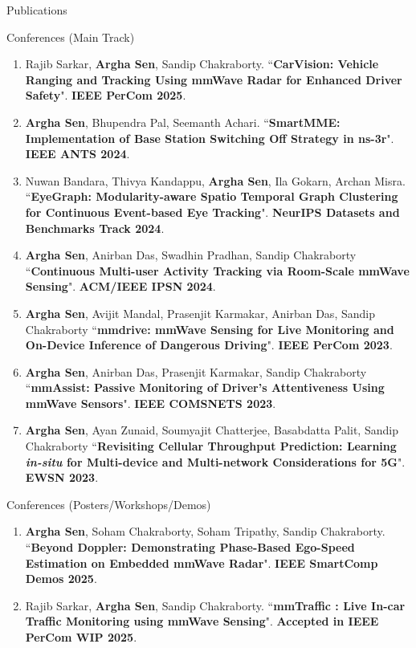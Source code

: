\documentclass{resume} %
\begin{document}
\begin{rSection}{Publications}
\begin{rSubsection}{Conferences (Main Track)}{}{}{}
\begin{enumerate}
				\item Rajib Sarkar, \textbf{Argha Sen}, Sandip Chakraborty.	``\textbf{CarVision: Vehicle Ranging and Tracking Using mmWave Radar for Enhanced Driver Safety}". \textbf{IEEE PerCom 2025}.
				
				\item \textbf{Argha Sen}, Bhupendra Pal, Seemanth Achari. 
				``\textbf{SmartMME: Implementation of Base Station Switching Off Strategy in ns-3r}". \textbf{IEEE ANTS 2024}.
				
				\item Nuwan Bandara, Thivya Kandappu, \textbf{Argha Sen}, Ila Gokarn, Archan Misra.
				``\textbf{EyeGraph: Modularity-aware Spatio Temporal Graph Clustering for Continuous Event-based Eye Tracking}".
				\textbf{NeurIPS Datasets and Benchmarks Track 2024}.
				
				\item \textbf{Argha Sen}, Anirban Das, Swadhin Pradhan, Sandip Chakraborty ``\textbf{Continuous Multi-user Activity Tracking via Room-Scale mmWave Sensing}". \textbf{ACM/IEEE IPSN 2024}.
				
				\item \textbf{Argha Sen}, Avijit Mandal, Prasenjit Karmakar, Anirban Das, Sandip Chakraborty ``\textbf{mmdrive: mmWave Sensing for Live Monitoring and On-Device Inference of Dangerous Driving}". \textbf{IEEE PerCom 2023}.
				
				\item \textbf{Argha Sen}, Anirban Das, Prasenjit Karmakar, Sandip Chakraborty ``\textbf{mmAssist: Passive Monitoring of Driver's Attentiveness Using mmWave Sensors}". \textbf{IEEE COMSNETS 2023}.
				
				\item \textbf{Argha Sen}, Ayan Zunaid, Soumyajit Chatterjee, Basabdatta Palit, Sandip Chakraborty ``\textbf{Revisiting Cellular Throughput Prediction: Learning \textit{in-situ} for Multi-device and Multi-network Considerations for 5G}". \textbf{EWSN 2023}.
				
			\end{enumerate}
			
		\end{rSubsection}{}{}{}{}		
		
		\begin{rSubsection}{Conferences (Posters/Workshops/Demos)}{}{}{}
			
			\begin{enumerate}
				\small
				\item \textbf{Argha Sen}, Soham Chakraborty, Soham Tripathy, Sandip Chakraborty.	``\textbf{Beyond Doppler: Demonstrating Phase-Based Ego-Speed Estimation on Embedded mmWave Radar}". \textbf{IEEE SmartComp Demos 2025}.
				\item Rajib Sarkar, \textbf{Argha Sen}, Sandip Chakraborty.	``\textbf{mmTraffic : Live In-car Traffic Monitoring using mmWave Sensing}". \textbf{Accepted in IEEE PerCom WIP 2025}.
				

\end{enumerate}
\end{rSubsection}
\end{rSection}
\end{document}
